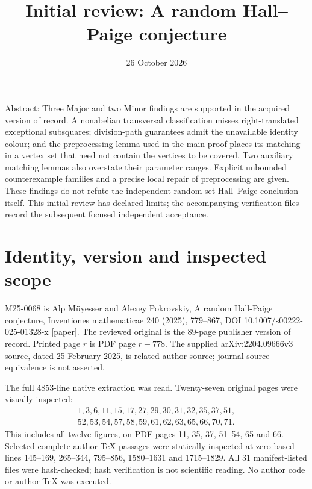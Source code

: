 \documentclass[10pt]{article}
\title{Initial review: A random Hall–Paige conjecture}
\author{}
\date{26 October 2026}
\begin{document}
\maketitle
Abstract: Three Major and two Minor findings are supported in the acquired version of record. A nonabelian transversal classification misses right-translated exceptional subsquares; division-path guarantees admit the unavailable identity colour; and the preprocessing lemma used in the main proof places its matching in a vertex set that need not contain the vertices to be covered. Two auxiliary matching lemmas also overstate their parameter ranges. Explicit unbounded counterexample families and a precise local repair of preprocessing are given. These findings do not refute the independent-random-set Hall–Paige conclusion itself. This initial review has declared limits; the accompanying verification files record the subsequent focused independent acceptance.\par
\section*{Identity, version and inspected scope}
M25-0068 is Alp Müyesser and Alexey Pokrovskiy, A random Hall-Paige conjecture, Inventiones mathematicae 240 (2025), 779–867, DOI 10.1007/s00222-025-01328-x [paper]. The reviewed original is the 89-page publisher version of record. Printed page \(r\) is PDF page \(r-778\). The supplied arXiv:2204.09666v3 source, dated 25 February 2025, is related author source; journal-source equivalence is not asserted.\par
The full 4853-line native extraction was read. Twenty-seven original pages were visually inspected: \[\begin{gathered}
1,3,6,11,15,17,27,29,30,31,32,35,37,51,\\
52,53,54,57,58,59,61,62,63,65,66,70,71.
\end{gathered}\] This includes all twelve figures, on PDF pages 11, 35, 37, 51–54, 65 and 66. Selected complete author-TeX passages were statically inspected at zero-based lines 145–169, 265–344, 795–856, 1580–1631 and 1715–1829. All 31 manifest-listed files were hash-checked; hash verification is not scientific reading. No author code or author TeX was executed.\par
\end{document}
